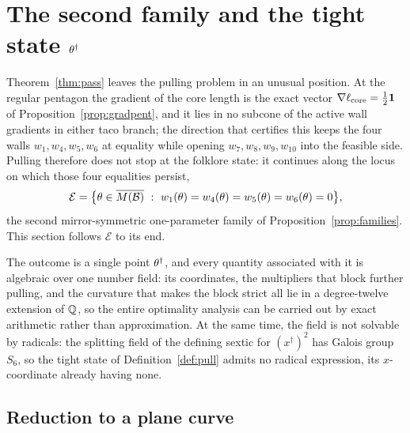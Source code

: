 \section{The second family and the tight state \texorpdfstring{$\theta^\dagger$}{}}\label{sec:family}

Theorem~\ref{thm:pass} leaves the pulling problem in an unusual position. At the regular pentagon the gradient of the core length is the exact vector $\nabla\ell_{\mathrm{core}}=\frac12\mathbf1$ of Proposition~\ref{prop:gradpent}, and it lies in no subcone of the active wall gradients in either taco branch; the direction that certifies this keeps the four walls $w_1,w_4,w_5,w_6$ at equality while opening $w_7,w_8,w_9,w_{10}$ into the feasible side. Pulling therefore does not stop at the folklore state: it continues along the locus on which those four equalities persist,
\begin{equation}\label{eq:family}
  \mathcal E=\bigl\{\theta\in\overline{\M}\ :\ w_1(\theta)=w_4(\theta)=w_5(\theta)=w_6(\theta)=0\bigr\},
\end{equation}
the second mirror-symmetric one-parameter family of Proposition~\ref{prop:families}. This section follows $\mathcal E$ to its end.

The outcome is a single point $\theta^\dagger$, and every quantity associated with it is algebraic over one number field: its coordinates, the multipliers that block further pulling, and the curvature that makes the block strict all lie in a degree-twelve extension of $\mathbb{Q}$, so the entire optimality analysis can be carried out by exact arithmetic rather than approximation. At the same time, the field is not solvable by radicals: the splitting field of the defining sextic for $(x^\dagger)^2$ has Galois group $S_6$, so the tight state of Definition~\ref{def:pull} admits no radical expression, its $x$-coordinate already having none.

\subsection{Reduction to a plane curve}

